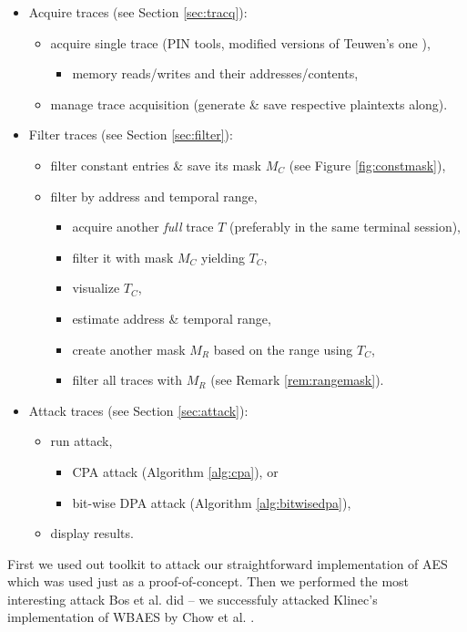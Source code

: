 \begin{itemize}
	\item Acquire traces (see Section \ref{sec:tracq}):
	\begin{itemize}
		\item acquire single trace (PIN tools, modified versions of Teuwen's one \cite{teuwen2015movfuscator}),
		\begin{itemize}
			\item memory reads/writes and their addresses/contents,
		\end{itemize}
		\item manage trace acquisition (generate \& save respective plaintexts along).
	\end{itemize}
	\item Filter traces (see Section \ref{sec:filter}):
	\begin{itemize}
		\item filter constant entries \& save its mask $M_C$ (see Figure \ref{fig:constmask}),
		\item filter by address and temporal range,
		\begin{itemize}
			\item acquire another {\em full} trace $T$ (preferably in the same terminal session),
			\item filter it with mask $M_C$ yielding $T_C$,
			\item visualize $T_C$,
			\item estimate address \& temporal range,
			\item create another mask $M_R$ based on the range using $T_C$,
			\item filter all traces with $M_R$ (see Remark \ref{rem:rangemask}).
		\end{itemize}
	\end{itemize}
	\item Attack traces (see Section \ref{sec:attack}):
	\begin{itemize}
		\item run attack,
		\begin{itemize}
			\item CPA attack (Algorithm \ref{alg:cpa}), or
			\item bit-wise DPA attack (Algorithm \ref{alg:bitwisedpa}),
		\end{itemize}
		\item display results.
	\end{itemize}
\end{itemize}

First we used out toolkit to attack our straightforward implementation of AES which was used just as a proof-of-concept. Then we performed the most interesting attack Bos et al. \cite{bos2015differential} did -- we successfuly attacked Klinec's implementation \cite{klinec2013implementation} of WBAES by Chow et al. \cite{chow2003aes}.

